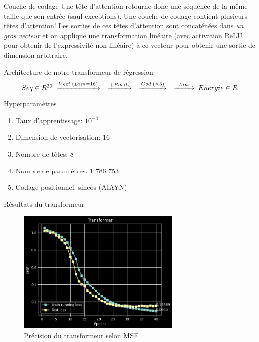 \documentclass{beamer}
\begin{document}
\begin{frame}{Couche de codage}
    Une tête d'attention retourne donc une séquence de la même taille que son entrée (sauf exceptions).
    Une couche de codage contient plusieurs têtes d'attention! Les sorties de ces 
    têtes d'attention sont concaténées dans {\it un gros vecteur} et on applique une transformation 
    linéaire (avec activation ReLU pour obtenir de l'expressivité non linéaire) à ce vecteur pour obtenir une sortie 
    de dimension arbitraire.
\end{frame}



\begin{frame}{Architecture de notre transformeur de régression}
\begin{equation*}
    \begin{CD}
        @. Seq \in R^{30}
        @>Vect. (Dim=16)>> 
        @>+Posit.>> 
        @>Cod. (\times 3)>> 
        @>Lin.>> Energie \in R
    \end{CD}
\end{equation*}

\begin{block}{Hyperparamètres}
\begin{enumerate}
    \item Taux d'apprentissage: $10^{-4}$
    \item Dimension de vectorisation: 16
    \item Nombre de têtes: 8
    \item Nombre de paramètres: 1 786 753 
    \item Codage positionnel: sincos (AIAYN)
\end{enumerate}
\end{block}
\end{frame}


\begin{frame}{Résultats du transformeur}
\begin{figure} \label{fig:transformer_accuracy}
    \caption{Précision du transformeur selon MSE} \center
    \includegraphics[width=0.7\textwidth]{images/2023-04-02-13-48-49.png}
\end{figure}
\end{frame}
\end{document}
